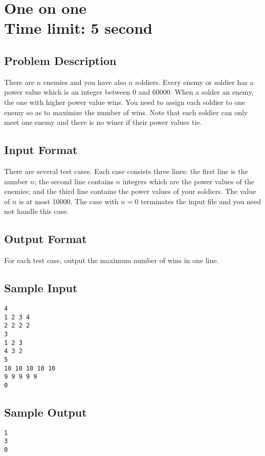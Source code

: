\documentclass[12pt,titlepage]{article}
\begin{document}
\section*{\centering One on one\\
Time limit: 5 second}

\subsection*{Problem Description}
\hspace{0.7cm}There are $n$ enemies and you have also $n$ soldiers. Every enemy or soldier has a power value which is an integer between 0 and 60000. When a solder an enemy, the one with higher power value wins. You need to assign each soldier to one enemy so as to maximize the number of wins. Note that each soldier can only meet one enemy and there is no winer if their power values tie.

\subsection*{Input Format}
\hspace{0.7cm}
There are several test cases. Each case consists three lines: the first line is the number $n$; the second line contains $n$ integers which are the power values of the enemies; and the third line contains the power values of your soldiers. The value of $n$ is at most 10000.
The case with $n=0$ terminates the input file and you need not handle this case.
\subsection*{Output Format}
\hspace{0.7cm}For each test case, output the maximum number of wins in one line. 
\subsection*{Sample Input}
\begin{verbatim}
4
1 2 3 4
2 2 2 2
3
1 2 3
4 3 2
5
10 10 10 10 10 
9 9 9 9 9
0
\end{verbatim}
\subsection*{Sample Output}
\begin{verbatim}
1
3
0
\end{verbatim}
\end{document}
